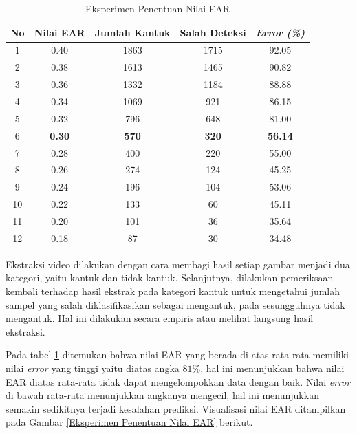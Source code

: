             \begin{table}[h]
            \centering
            \caption{Eksperimen Penentuan Nilai EAR}
            \begin{tabular}{ccccc}
                \toprule
                 \textbf{No} &\textbf{Nilai EAR} & \textbf{Jumlah Kantuk} & \textbf{Salah Deteksi} & \textbf{\textit{Error (\%)}} \\
                \midrule
                   
                      
                         1 & 0.40 & 1863 & 1715 & 92.05 \\
                         2 &  0.38 & 1613 & 1465 & 90.82 \\
                         3 & 0.36 & 1332 & 1184 & 88.88 \\
                         4 &  0.34 & 1069 & 921  & 86.15 \\
                         5 &  0.32 & 796  & 648  & 81.00 \\
                         6 & \textbf{0.30} &\textbf{ 570} & \textbf{320} & \textbf{56.14} \\
                         7 & 0.28 & 400 & 220 & 55.00 \\
                         8 &  0.26 & 274 & 124 & 45.25 \\
                         9 &  0.24 & 196 & 104 & 53.06 \\
                         10 &  0.22 & 133 & 60& 45.11 \\
                         11 &  0.20 & 101 & 36  & 35.64 \\
                         12 &  0.18 & 87  & 30  & 34.48\\
    
                    \bottomrule
                \end{tabular}
                \label{Penentuan Nilai EAR}
            \end{table}

           Ekstraksi video dilakukan dengan cara membagi hasil setiap gambar menjadi dua kategori, yaitu kantuk dan tidak kantuk. Selanjutnya, dilakukan pemeriksaan kembali terhadap hasil ekstrak pada kategori kantuk untuk mengetahui jumlah sampel yang salah diklasifikasikan sebagai mengantuk, pada sesungguhnya tidak mengantuk. Hal ini dilakukan secara empiris atau melihat langsung hasil ekstraksi.


            Pada tabel \ref{Penentuan Nilai EAR} ditemukan bahwa nilai EAR yang berada di atas rata-rata memiliki nilai \textit{error} yang tinggi yaitu diatas angka $ 81\%$, hal ini menunjukkan bahwa nilai EAR diatas rata-rata tidak dapat mengelompokkan data dengan baik. Nilai \textit{error} di bawah rata-rata menunjukkan angkanya mengecil, hal ini menunjukkan semakin sedikitnya terjadi kesalahan prediksi. Visualisasi nilai EAR ditampilkan pada Gambar \ref{Eksperimen Penentuan Nilai EAR} berikut.


